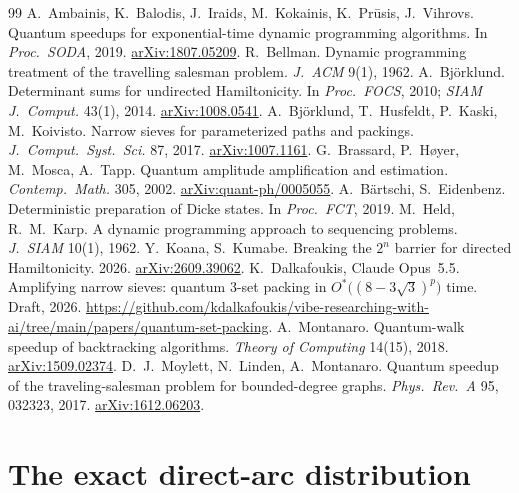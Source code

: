 \documentclass[11pt,a4paper]{article}
\theoremstyle{plain}
\theoremstyle{remark}
\newcommand{\Ostar}{O^{*}}
\begin{document}
\begin{thebibliography}{99}
 A.~Ambainis, K.~Balodis, J.~Iraids, M.~Kokainis, K.~Pr\={u}sis, J.~Vihrovs. Quantum speedups for exponential-time dynamic programming algorithms. In \emph{Proc.\ SODA}, 2019. \href{https://arxiv.org/abs/1807.05209}{arXiv:1807.05209}.
 R.~Bellman. Dynamic programming treatment of the travelling salesman problem. \emph{J.\ ACM} 9(1), 1962.
 A.~Björklund. Determinant sums for undirected Hamiltonicity. In \emph{Proc.\ FOCS}, 2010; \emph{SIAM J.\ Comput.} 43(1), 2014. \href{https://arxiv.org/abs/1008.0541}{arXiv:1008.0541}.
 A.~Björklund, T.~Husfeldt, P.~Kaski, M.~Koivisto. Narrow sieves for parameterized paths and packings. \emph{J.\ Comput.\ Syst.\ Sci.} 87, 2017. \href{https://arxiv.org/abs/1007.1161}{arXiv:1007.1161}.
 G.~Brassard, P.~H{\o}yer, M.~Mosca, A.~Tapp. Quantum amplitude amplification and estimation. \emph{Contemp.\ Math.} 305, 2002. \href{https://arxiv.org/abs/quant-ph/0005055}{arXiv:quant-ph/0005055}.
 A.~B{\"a}rtschi, S.~Eidenbenz. Deterministic preparation of Dicke states. In \emph{Proc.\ FCT}, 2019.
 M.~Held, R.~M.~Karp. A dynamic programming approach to sequencing problems. \emph{J.\ SIAM} 10(1), 1962.
 Y.~Koana, S.~Kumabe. Breaking the $2^n$ barrier for directed Hamiltonicity. 2026. \href{https://arxiv.org/abs/2609.39062}{arXiv:2609.39062}.
 K.~Dalkafoukis, Claude Opus~5.5. Amplifying narrow sieves: quantum 3-set packing in $\Ostar\big((8-3\sqrt3)^p\big)$ time. Draft, 2026. \url{https://github.com/kdalkafoukis/vibe-researching-with-ai/tree/main/papers/quantum-set-packing}.
 A.~Montanaro. Quantum-walk speedup of backtracking algorithms. \emph{Theory of Computing} 14(15), 2018. \href{https://arxiv.org/abs/1509.02374}{arXiv:1509.02374}.
 D.~J.~Moylett, N.~Linden, A.~Montanaro. Quantum speedup of the traveling-salesman problem for bounded-degree graphs. \emph{Phys.\ Rev.\ A} 95, 032323, 2017. \href{https://arxiv.org/abs/1612.06203}{arXiv:1612.06203}.
\end{thebibliography}

\appendix
\section{The exact direct-arc distribution}\label{app:count}
\end{document}
